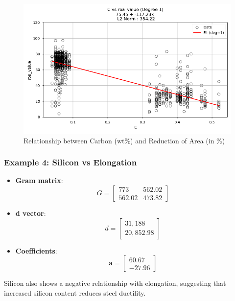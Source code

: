 \documentclass[10pt]{article}
\begin{document}
\begin{figure}[H]
    \centering
    \includegraphics[width=\imagewidthone\textwidth]{figures/03_leastsq/C_vs_roa_value_deg1.png}
    \caption{Relationship between Carbon (wt\%) and Reduction of Area (in \%)}
\end{figure}

\newpage
\subsubsection{Example 4: Silicon vs Elongation}
\begin{itemize}
    \item \textbf{Gram matrix}:
    \[
    G = \begin{bmatrix}
    773 & 562.02 \\
    562.02 & 473.82
    \end{bmatrix}
    \]
    \item \textbf{d vector}:
    \[
    d = \begin{bmatrix}
    31,188 \\
    20,852.98
    \end{bmatrix}
    \]
    \item \textbf{Coefficients}:
    \[
    \mathbf{a} = \begin{bmatrix}
    60.67 \\
    -27.96
    \end{bmatrix}
    \]
\end{itemize}

Silicon also shows a negative relationship with elongation, suggesting that increased silicon content reduces steel ductility.
\end{document}
